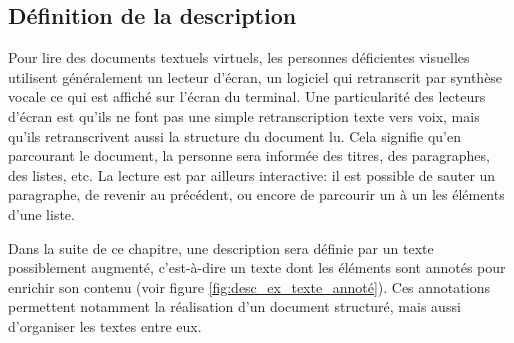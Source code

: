 \subsection{Définition de la description}

Pour lire des documents textuels virtuels, les personnes déficientes visuelles utilisent généralement un lecteur d’écran, un logiciel qui retranscrit par synthèse vocale ce qui est affiché sur l’écran du terminal. Une particularité des lecteurs d’écran est qu’ils ne font pas une simple retranscription texte vers voix, mais qu’ils retranscrivent aussi la structure du document lu. Cela signifie qu’en parcourant le document, la personne sera informée des titres, des paragraphes, des listes, etc. La lecture est par ailleurs interactive: il est possible de sauter un paragraphe, de revenir au précédent, ou encore de parcourir un à un les éléments d’une liste.

\newpar{}

Dans la suite de ce chapitre, une description sera définie par un texte possiblement augmenté, c’est-à-dire un texte dont les éléments sont annotés pour enrichir son contenu \citep{oren2006semantic} (voir figure \ref{fig:desc_ex_texte_annoté}). Ces annotations permettent notamment la réalisation d’un document structuré, mais aussi d’organiser les textes entre eux.

